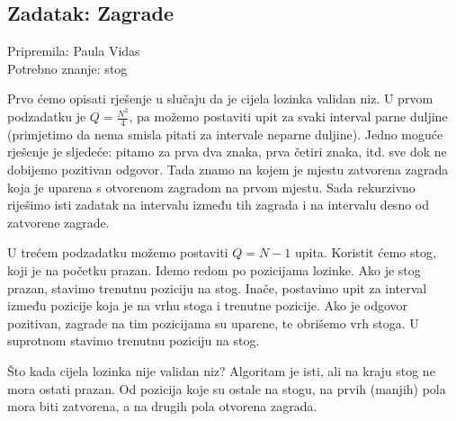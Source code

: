 \subsection*{Zadatak: Zagrade}
\textsf{Pripremila: Paula Vidas}\\
\textsf{Potrebno znanje: stog}

Prvo ćemo opisati rješenje u slučaju da je cijela lozinka validan niz. U prvom
podzadatku je $Q = \frac{N^2}{4}$, pa možemo postaviti upit za svaki interval
parne duljine (primjetimo da nema smisla pitati za intervale neparne duljine).
Jedno moguće rješenje je sljedeće: pitamo za prva dva znaka, prva četiri znaka,
itd. sve dok ne dobijemo pozitivan odgovor. Tada znamo na kojem je mjestu
zatvorena zagrada koja je uparena s otvorenom zagradom na prvom mjestu. Sada
rekurzivno riješimo isti zadatak na intervalu između tih zagrada i na intervalu
desno od zatvorene zagrade.

U trećem podzadatku možemo postaviti $Q = N - 1$ upita. Koristit ćemo stog, koji
je na početku prazan. Idemo redom po pozicijama lozinke. Ako je stog prazan,
stavimo trenutnu poziciju na stog. Inače, postavimo upit za interval između
pozicije koja je na vrhu stoga i trenutne pozicije. Ako je odgovor pozitivan,
zagrade na tim pozicijama su uparene, te obrišemo vrh stoga. U suprotnom stavimo
trenutnu poziciju na stog.

Što kada cijela lozinka nije validan niz? Algoritam je isti, ali na kraju stog
ne mora ostati prazan. Od pozicija koje su ostale na stogu, na prvih (manjih)
pola mora biti zatvorena, a na drugih pola otvorena zagrada.
